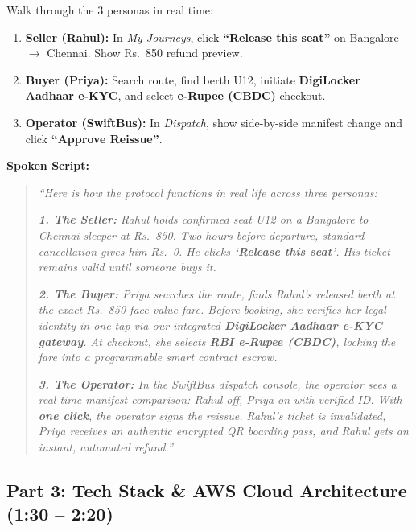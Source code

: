 \documentclass[11pt,a4paper]{article}
\newcommand{\inr}{Rs.~}
\begin{document}
\begin{visualcue}
Walk through the 3 personas in real time:
\begin{enumerate}[noitemsep,topsep=0pt]
    \item \textbf{Seller (Rahul):} In \textit{My Journeys}, click \textbf{``Release this seat''} on Bangalore $\rightarrow$ Chennai. Show \inr 850 refund preview.
    \item \textbf{Buyer (Priya):} Search route, find berth U12, initiate \textbf{DigiLocker Aadhaar e-KYC}, and select \textbf{e-Rupee (CBDC)} checkout.
    \item \textbf{Operator (SwiftBus):} In \textit{Dispatch}, show side-by-side manifest change and click \textbf{``Approve Reissue''}.
\end{enumerate}
\end{visualcue}

\noindent\textbf{Spoken Script:}
\begin{quote}
\textit{``Here is how the protocol functions in real life across three personas:}

\textit{\textbf{1. The Seller:} Rahul holds confirmed seat U12 on a Bangalore to Chennai sleeper at \inr 850. Two hours before departure, standard cancellation gives him \inr 0. He clicks \textbf{`Release this seat'}. His ticket remains valid until someone buys it.}

\textit{\textbf{2. The Buyer:} Priya searches the route, finds Rahul's released berth at the exact \inr 850 face-value fare. Before booking, she verifies her legal identity in one tap via our integrated \textbf{DigiLocker Aadhaar e-KYC gateway}. At checkout, she selects \textbf{RBI e-Rupee (CBDC)}, locking the fare into a programmable smart contract escrow.}

\textit{\textbf{3. The Operator:} In the SwiftBus dispatch console, the operator sees a real-time manifest comparison: Rahul off, Priya on with verified ID. With \textbf{one click}, the operator signs the reissue. Rahul's ticket is invalidated, Priya receives an authentic encrypted QR boarding pass, and Rahul gets an instant, automated refund.''}
\end{quote}

\vspace{0.4em}

\subsection*{Part 3: Tech Stack \& AWS Cloud Architecture (1:30 -- 2:20)}
\end{document}
